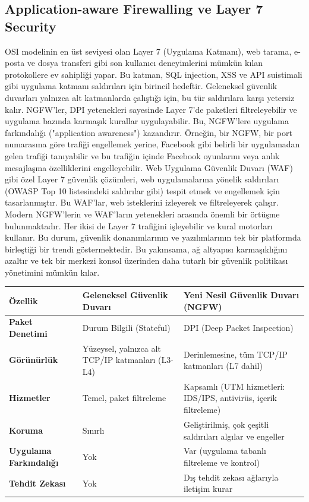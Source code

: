 \subsection{Application-aware Firewalling ve Layer 7 Security}

OSI modelinin en üst seviyesi olan Layer 7 (Uygulama Katmanı), web tarama, e-posta ve dosya transferi gibi son kullanıcı deneyimlerini mümkün kılan protokollere ev sahipliği yapar. Bu katman, SQL injection, XSS ve API suistimali gibi uygulama katmanı saldırıları için birincil hedeftir. Geleneksel güvenlik duvarları yalnızca alt katmanlarda çalıştığı için, bu tür saldırılara karşı yetersiz kalır.
NGFW'ler, DPI yetenekleri sayesinde Layer 7'de paketleri filtreleyebilir ve uygulama bazında karmaşık kurallar uygulayabilir. Bu, NGFW'lere uygulama farkındalığı ("application awareness") kazandırır. Örneğin, bir NGFW, bir port numarasına göre trafiği engellemek yerine, Facebook gibi belirli bir uygulamadan gelen trafiği tanıyabilir ve bu trafiğin içinde Facebook oyunlarını veya anlık mesajlaşma özelliklerini engelleyebilir.
Web Uygulama Güvenlik Duvarı (WAF) gibi özel Layer 7 güvenlik çözümleri, web uygulamalarına yönelik saldırıları (OWASP Top 10 listesindeki saldırılar gibi) tespit etmek ve engellemek için tasarlanmıştır. Bu WAF'lar, web isteklerini izleyerek ve filtreleyerek çalışır. Modern NGFW'lerin ve WAF'ların yetenekleri arasında önemli bir örtüşme bulunmaktadır. Her ikisi de Layer 7 trafiğini işleyebilir ve kural motorları kullanır. Bu durum, güvenlik donanımlarının ve yazılımlarının tek bir platformda birleştiği bir trendi göstermektedir. Bu yakınsama, ağ altyapısı karmaşıklığını azaltır ve tek bir merkezi konsol üzerinden daha tutarlı bir güvenlik politikası yönetimini mümkün kılar.

\begin{tabular}{|p{4cm}|p{6cm}|p{4cm}|}
\hline
\hline
\textbf{Özellik} & \textbf{Geleneksel Güvenlik Duvarı} & \textbf{Yeni Nesil Güvenlik Duvarı (NGFW)} \\
\hline
\hline
\textbf{Paket Denetimi} & Durum Bilgili (Stateful) & DPI (Deep Packet Inspection) \\
\hline
\hline
\textbf{Görünürlük} & Yüzeysel, yalnızca alt TCP/IP katmanları (L3-L4) & Derinlemesine, tüm TCP/IP katmanları (L7 dahil) \\
\hline
\hline
\textbf{Hizmetler} & Temel, paket filtreleme & Kapsamlı (UTM hizmetleri: IDS/IPS, antivirüs, içerik filtreleme) \\
\hline
\hline
\textbf{Koruma} & Sınırlı & Geliştirilmiş, çok çeşitli saldırıları algılar ve engeller \\
\hline
\hline
\textbf{Uygulama Farkındalığı} & Yok & Var (uygulama tabanlı filtreleme ve kontrol) \\
\hline
\hline
\textbf{Tehdit Zekası} & Yok & Dış tehdit zekası ağlarıyla iletişim kurar \\
\hline
\hline
\hline
\end{tabular}


